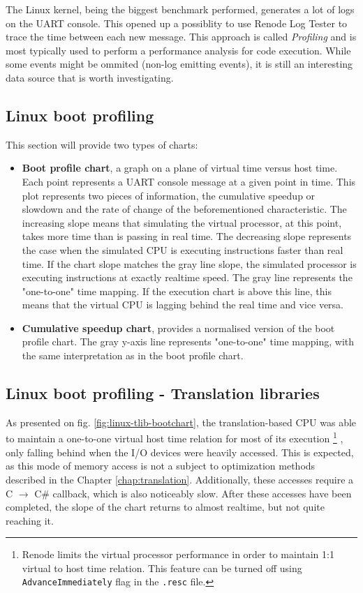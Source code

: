 \noindent
The Linux kernel, being the biggest benchmark performed, generates a lot of logs on the UART console. This opened up a
possiblity to use Renode Log Tester to trace the time between each new message. This approach is called
\textit{Profiling} and is most typically used to perform a performance analysis for code execution. While some events
might be ommited (non-log emitting events), it is still an interesting data source that is worth investigating.

\pagebreak

\subsection{Linux boot profiling}
This section will provide two types of charts:
\begin{itemize}
    \item{\textbf{Boot profile chart}, a graph on a plane of virtual time versus host time. Each point represents a
    UART console message at a given point in time. This plot represents two pieces of information, the cumulative
    speedup or slowdown and the rate of change of the beforementioned characteristic. The increasing slope means that
    simulating the virtual processor, at this point, takes more time than is passing in real time. The decreasing slope
    represents the case when the simulated CPU is executing instructions faster than real time. If the chart slope
    matches the gray line slope, the simulated processor is executing instructions at exactly realtime speed.
    The gray line represents the "one-to-one" time mapping. If the execution chart is above this line, this means
    that the virtual CPU is lagging behind the real time and vice versa.}
    \item{\textbf{Cumulative speedup chart}, provides a normalised version of the boot profile chart.
    The gray y-axis line represents "one-to-one" time mapping, with the same interpretation as in the boot profile
    chart.}
\end{itemize}


\subsection*{Linux boot profiling - Translation libraries}

As presented on fig. \ref{fig:linux-tlib-bootchart}, the translation-based CPU was able to maintain a one-to-one virtual host time relation for most of
its execution%
\footnote{Renode limits the virtual processor performance in order to maintain 1:1 virtual to host time relation. This
          feature can be turned off using \texttt{AdvanceImmediately} flag in the \texttt{.resc} file.}%
, only falling behind when the I/O devices were heavily accessed. This is expected, as this mode of memory
access is not a subject to optimization methods described in the Chapter \ref{chap:translation}. Additionally, these accesses require a C
$\rightarrow$ C\# callback, which is also noticeably slow. After these accesses have been completed, the slope of the
chart returns to almost realtime, but not quite reaching it.

